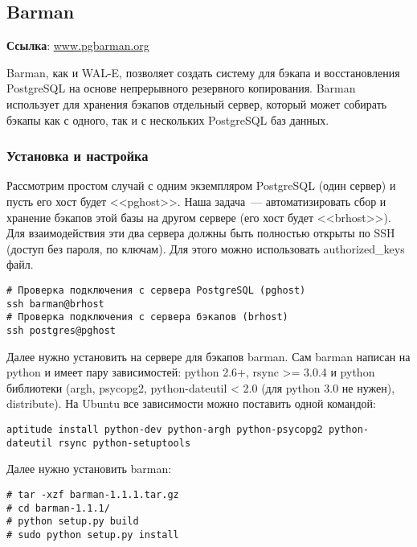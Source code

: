 \subsection{Barman}
\textbf{Ссылка}: \href{http://www.pgbarman.org/}{www.pgbarman.org}

Barman, как и WAL-E, позволяет создать систему для бэкапа и восстановления PostgreSQL на основе непрерывного резервного копирования. Barman использует для хранения бэкапов отдельный сервер, который может собирать бэкапы как с одного, так и с нескольких PostgreSQL баз данных.

\subsubsection{Установка и настройка}

Рассмотрим простом случай с одним экземпляром PostgreSQL (один сервер) и пусть его хост будет <<pghost>>. Наша задача~--- автоматизировать сбор и хранение бэкапов этой базы на другом сервере (его хост будет <<brhost>>). Для взаимодействия эти два сервера должны быть полностью открыты по SSH (доступ без пароля, по ключам). Для этого можно использовать authorized\_keys файл.

\begin{lstlisting}[label=lst:barman1,caption=Проверка подключения по SSH]
# Проверка подключения с сервера PostgreSQL (pghost)
ssh barman@brhost
# Проверка подключения с сервера бэкапов (brhost)
ssh postgres@pghost
\end{lstlisting}

Далее нужно установить на сервере для бэкапов barman. Сам barman написан на python и имеет пару зависимостей: python 2.6+, rsync >= 3.0.4 и python библиотеки (argh, psycopg2, python-dateutil < 2.0 (для python 3.0 не нужен), distribute). На Ubuntu все зависимости можно поставить одной командой:

\begin{lstlisting}[label=lst:barman2,caption=Установка зависимостей barman]
aptitude install python-dev python-argh python-psycopg2 python-dateutil rsync python-setuptools
\end{lstlisting}

Далее нужно установить barman:

\begin{lstlisting}[label=lst:barman3,caption=Установка barman]
# tar -xzf barman-1.1.1.tar.gz
# cd barman-1.1.1/
# python setup.py build
# sudo python setup.py install
\end{lstlisting}

